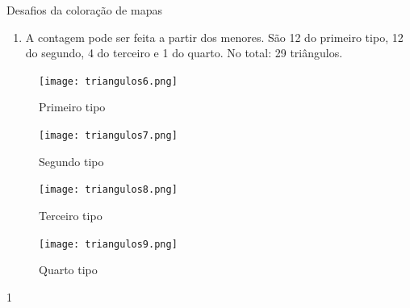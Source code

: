 \begin{answer}{Desafios da coloração de mapas}
{
\begin{enumerate}
\item A contagem pode ser feita a partir dos menores. São 12 do primeiro tipo, 12 do segundo, 4 do terceiro e 1 do quarto. No total: 29 triângulos.
\end{enumerate}

\centering
\begin{minipage}{.2\linewidth}
\begin{figure}[H]
\centering

\texttt{[image: triangulos6.png]}
\caption*{Primeiro tipo}
\end{figure}
\end{minipage}
\begin{minipage}{.2\linewidth}
\begin{figure}[H]
\centering

\texttt{[image: triangulos7.png]}
\caption*{Segundo tipo}
\end{figure}
\end{minipage}
\begin{minipage}{.2\linewidth}
\begin{figure}[H]
\centering

\texttt{[image: triangulos8.png]}
\caption*{Terceiro tipo}
\end{figure}
\end{minipage}
\begin{minipage}{.2\linewidth}
\begin{figure}[H]
\centering

\texttt{[image: triangulos9.png]}
\caption*{Quarto tipo}
\end{figure}
\end{minipage}
}{1}
\end{answer}

